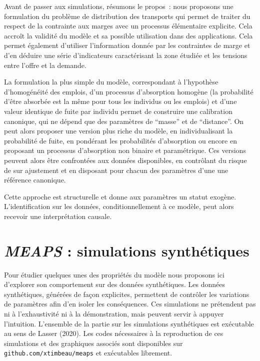 \documentclass[
  10pt,
  a4paper,
  numbers=noendperiod,
  DIV=9]{scrreprt}
\begin{document}
Avant de passer aux simulations, résumons le propos~: nous proposons une
formulation du problème de distribution des transports qui permet de
traiter du respect de la contrainte aux marges avec un processus
élémentaire explicite. Cela accroît la validité du modèle et sa possible
utilisation dans des applications. Cela permet également d'utiliser
l'information donnée par les contraintes de marge et d'en déduire une
série d'indicateurs caractérisant la zone étudiée et les tensions entre
l'offre et la demande.

La formulation la plus simple du modèle, correspondant à l'hypothèse
d'homogénéité des emplois, d'un processus d'absorption homogène (la
probabilité d'être absorbée est la même pour tous les individus ou les
emplois) et d'une valeur identique de fuite par individu permet de
construire une calibration canonique, qui ne dépend que des paramètres
de ``masse'' et de ``distance''. On peut alors proposer une version plus
riche du modèle, en individualisant la probabilité de fuite, en
pondérant les probabilités d'absorption ou encore en proposant un
processus d'absorption non binaire et paramétrique. Ces versions peuvent
alors être confrontées aux données disponibles, en contrôlant du risque
de sur ajustement et en disposant pour chacun des paramètres d'une une
référence canonique.

Cette approche est structurelle et donne aux paramètres un statut
exogène. L'identification sur les données, conditionnellement à ce
modèle, peut alors recevoir une interprétation causale.


\hypertarget{sec-synt}{%
\chapter{\texorpdfstring{\emph{MEAPS} : simulations
synthétiques}{MEAPS : simulations synthétiques}}\label{sec-synt}}

Pour étudier quelques unes des propriétés du modèle nous proposons ici
d'explorer son comportement sur des données synthétiques. Les données
synthétiques, générées de façon explicites, permettent de contrôler les
variations de paramètres afin d'en isoler les conséquences. Ces
simulations ne prétendent pas ni à l'exhaustivité ni à la démonstration,
mais peuvent servir à appuyer l'intuition. L'ensemble de la partie sur
les simulations synthétiques est exécutable au sens de Lasser (2020).
Les codes nécessaires à la reproduction de ces simulations et des
graphiques associés sont disponibles sur
\texttt{github.com/xtimbeau/meaps} et exécutables librement.
\end{document}
